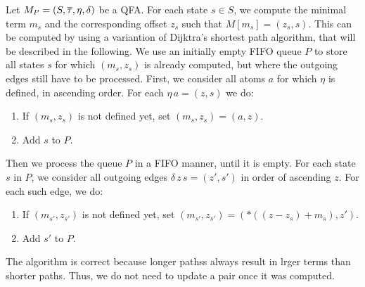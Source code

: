 Let $M_P = (S, \overline{\tau}, \eta, \delta)$ be a QFA.\@
For each state $s \in S$, we compute the minimal term $m_s$ and the corresponding offset $z_s$ such that $M[m_s] = (z_s,s)$.
This can be computed by using a variantion of Dijktra's shortest path algorithm,
that will be described in the following.
We use an initially empty FIFO queue $P$ to store all states $s$ for which $(m_s,z_s)$ is already computed,
but where the outgoing edges still have to be processed.
First, we consider all atoms $a$ for which $\eta$ is defined, in ascending order. For each $\eta\,a = (z,s)$ we do:
\begin{enumerate}
    \item If $(m_s,z_s)$ is not defined yet, set $(m_s,z_s) = (a,z)$.
    \item Add $s$ to $P$.
\end{enumerate}
Then we process the queue $P$ in a FIFO manner, until it is empty.
For each state $s$ in $P$, we consider all outgoing edges $\delta\,z\,s = (z',s')$ in order of ascending $z$.
For each such edge, we do:
\begin{enumerate}
    \item If $(m_{s'},z_{s'})$ is not defined yet, set $(m_{s'},z_{s'}) = (*((z-z_s)+m_s),z')$.
    \item Add $s'$ to $P$.
\end{enumerate}
The algorithm is correct because longer pathss always result in lrger terms than shorter paths.
Thus, we do not need to update a pair once it was computed.

\begin{example}
\end{example}
